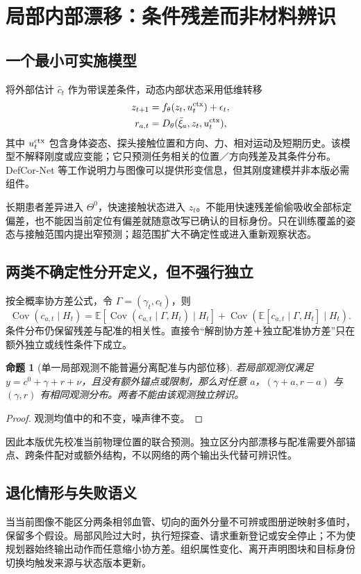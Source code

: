 \documentclass[UTF8,fontset=fandol,11pt,a4paper]{ctexart}
\theoremstyle{plain}
\newtheorem{proposition}[theorem]{命题}
\theoremstyle{definition}
\theoremstyle{remark}
\numberwithin{equation}{section}
\newcommand{\E}{\mathbb E}
\DeclareMathOperator{\Cov}{Cov}
\begin{document}
\section{局部内部漂移：条件残差而非材料辨识}
\label{sec:drift}
\subsection{一个最小可实施模型}
将外部估计 $\hat c_t$ 作为带误差条件，动态内部状态采用低维转移
\begin{align}
 z_{t+1}&=f_\theta(z_t,u_t^{\rm ctx})+\epsilon_t,\\
 r_{a,t}&=D_\theta(\bar\xi_a,z_t,u_t^{\rm ctx}),
 \label{eq:latent}
\end{align}
其中 $u_t^{\rm ctx}$ 包含身体姿态、探头接触位置和方向、力、相对运动及短期历史。该模型不解释刚度或应变能；它只预测任务相关的位置／方向残差及其条件分布。DefCor-Net 等工作说明力与图像可以提供形变信息，但其刚度建模并非本版必需组件\cite{defcor}。

长期患者差异进入 $\Theta^0$，快速接触状态进入 $z_t$。不能用快速残差偷偷吸收全部标定偏差，也不能因当前定位有偏差就随意改写已确认的目标身份。只在训练覆盖的姿态与接触范围内提出窄预测；超范围扩大不确定性或进入重新观察状态。

\subsection{两类不确定性分开定义，但不强行独立}
按全概率协方差公式，令 $\Gamma=(\gamma_t,c_t)$，则
\begin{equation}
 \Cov(c_{a,t}\mid H_t)=
 \E[\Cov(c_{a,t}\mid\Gamma,H_t)\mid H_t]
 +\Cov(\E[c_{a,t}\mid\Gamma,H_t]\mid H_t).
 \label{eq:totalcov}
\end{equation}
条件分布仍保留残差与配准的相关性。直接令“解剖协方差＋独立配准协方差”只在额外独立或线性条件下成立。

\begin{proposition}[单一局部观测不能普遍分离配准与内部位移]
若局部观测仅满足 $y=c^0+\gamma+r+\nu$，且没有额外锚点或限制，那么对任意 $a$，$(\gamma+a,r-a)$ 与 $(\gamma,r)$ 有相同观测分布。两者不能由该观测独立辨识。
\end{proposition}
\begin{proof}观测均值中的和不变，噪声律不变。\end{proof}
因此本版优先校准当前物理位置的联合预测。独立区分内部漂移与配准需要外部锚点、跨条件配对或额外结构，不以网络的两个输出头代替可辨识性。

\subsection{退化情形与失败语义}
当当前图像不能区分两条相邻血管、切向的面外分量不可辨或图册逆映射多值时，保留多个假设。局部风险过大时，执行短探查、请求重新登记或安全停止；不为使规划器始终输出动作而任意缩小协方差。组织属性变化、离开声明图块和目标身份切换均触发来源与状态版本更新。
\end{document}
